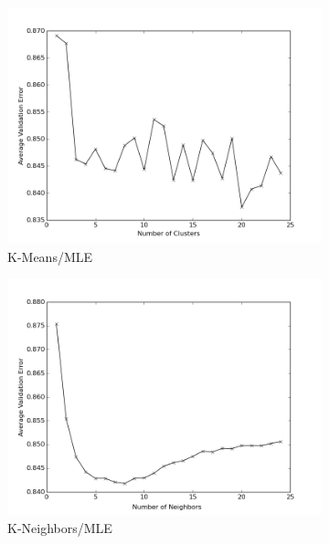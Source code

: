 \documentclass[11pt]{article}
\begin{document}
\begin{figure}[h!]
    \begin{subfigure}[h!]{0.33\textwidth}
        \includegraphics[width=\textwidth]{NL_kmeans_mle.png}
        \caption{K-Means/MLE}
        \label{fig:kmMLE_NL}
    \end{subfigure}%
    \begin{subfigure}[h!]{0.33\textwidth}
        \includegraphics[width=\textwidth]{NL_KN_mle.png}
        \caption{K-Neighbors/MLE}
        \label{fig:knMLE_NL}
    \end{subfigure}
    \begin{subfigure}[h!]{0.33\textwidth}

\end{subfigure}
\end{figure}
\end{document}
